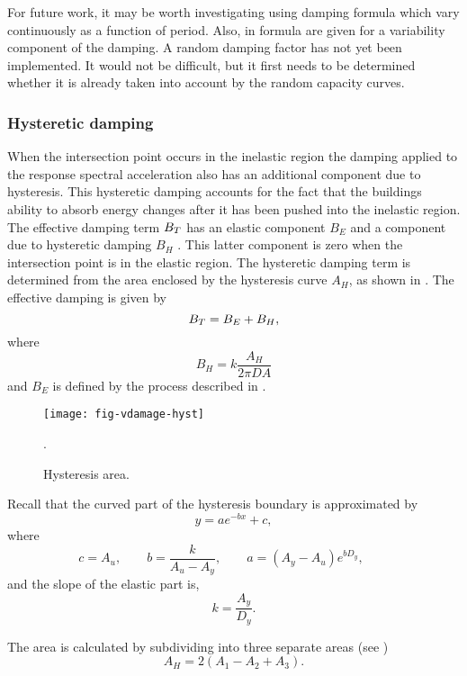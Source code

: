 For future work, it may be worth investigating using damping
formula which vary continuously as a function of period. Also, in
\cite{Newmark82} formula are given for a variability component of
the damping. A random damping factor has not yet been implemented.
It would not be difficult, but it first needs to be determined
whether it is already taken into account by the random capacity
curves.



\subsubsection{Hysteretic damping}
\label{sec:dam-hystericdamping}

When the intersection point occurs in the inelastic region the
damping applied to the response spectral
acceleration also has an
additional component due to hysteresis. This hysteretic damping
accounts for the fact that the buildings ability to absorb energy
changes after it has been pushed into the inelastic region. The
effective damping term $\Beff$ has an
elastic component $B_E$ and a component due to hysteretic damping
$B_H$ . This latter component is zero when the intersection point
is in the elastic region. The hysteretic damping term is
determined from the area enclosed by the hysteresis curve $A_H$,
as shown in . The effective
damping is given by
\begin{equation}
\Beff = B_E + B_H,
\end{equation}
where
\begin{equation}
B_H = k \frac{A_H}{2\pi DA}
\end{equation}
and $B_E$ is defined by the process described in
.
\begin{figure}
\centering
{}
\texttt{[image: fig-vdamage-hyst]}
\caption{Hysteresis area.}
\label{fig:vdamage-hystarea}.
\end{figure}

Recall that the curved part of the hysteresis boundary is
approximated by
$$
 y = ae^{-bx}+c,
$$
where
$$
 c = A_u, \qquad
 b = \frac{k}{A_u-A_y}, \qquad
 a = (A_y-A_u)e^{b D_y}, \qquad
$$
and the slope of the elastic part is,
$$
 k = \frac{A_y}{D_y}.
$$

The area is calculated by subdividing into three separate areas
(see )
$$
 A_H = 2(A_1-A_2+A_3).
$$

